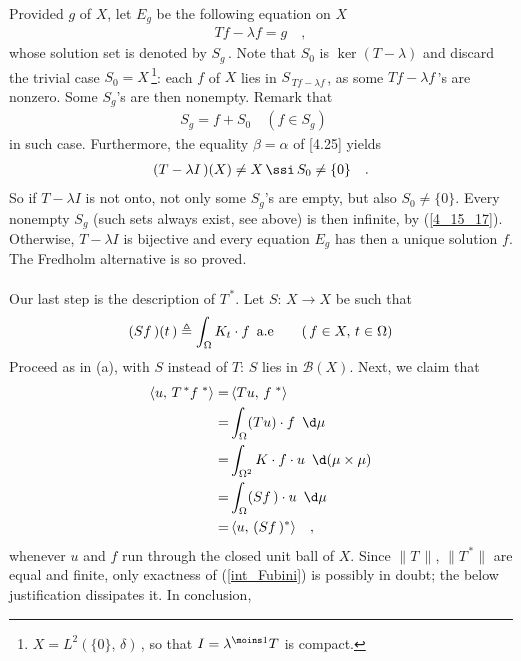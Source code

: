 \\
Provided  $g$ of $X$, let $E_g$ be the following equation on $X$
\begin{align}Tf-\lambda f =g \quad ,\end{align}
whose solution set is denoted by $S_g\,$. Note that $S_0$ is $\ker (T-\lambda)$ and discard the trivial case $S_0=X\,$\footnote{\eg$ X=L^2(\{0\},\, \delta)\,$, so that $I=\lambda^{\moins 1} T $ is compact. }: each $f$ of $X $ lies in $S_{\,Tf-\lambda f\,} $, as some $Tf-\lambda f\,$'s are nonzero. Some $S_g$'s are then nonempty. Remark that 
\begin{align}\label{4_15_17}
S_g= f + S_0 \quad (f\in S_g) \quad 
\end{align}
in such case. Furthermore, the equality $\beta= \alpha $ of [4.25] yields 
\begin{align}
(T-\lambda I\,)(X)\neq X \, \ssi\, S_0 \neq\{0\}  \quad .
\end{align}
So if $T-\lambda I$ is not onto, not only some $S_g$'s are empty, but also $S_0\neq\{0\}$. Every nonempty $S_g$ (such sets always exist, see above) is then infinite, by (\ref{4_15_17}).\\
Otherwise, $T-\lambda I$ is bijective and every equation $E_g$ has then a unique solution $f$. The Fredholm alternative is so proved. \\
\\
Our last step is the description of $T^{\,\ast}$. Let $S:\, X\to X$ be such that
\begin{align}
(Sf\,)(t\,)\triangleq \int_\Omega K_t \cdot f \,\,\, \text{a.e}\quad \quad (\,f\in X,\, t\in \Omega)
\end{align}
Proceed as in (a), with $S$ instead of $T$: $S$ lies in $\mathscr{B}(X)$. Next, we claim that 
\begin{align}
\langle u,\, T^{\,\ast} f^{\,\,\ast}  \rangle = &\, \langle Tu,\,f^{\,\,\ast}   \rangle\\
=&  \int_{\Omega} (T  u ) \cdot  f \,\, \,\d\mu \\
\label{int_Fubini}=& \int_{\Omega^2} K\cdot f \cdot  u \,\,\, \d(\mu\times\mu) \\
=&  \int_{\Omega} (S  f\, ) \cdot  u \,\,\, \d\mu\,  \\
=&\, \langle u,\, (S f\, )^\ast \rangle \quad ,
\end{align}
whenever $u$ and $f$ run through the closed unit ball of $X$. Since $\|T\, \|$, $\| T^{\,\ast} \|$ are equal and finite, only exactness of (\ref{int_Fubini}) is possibly in doubt; the below justification dissipates it. In conclusion,
